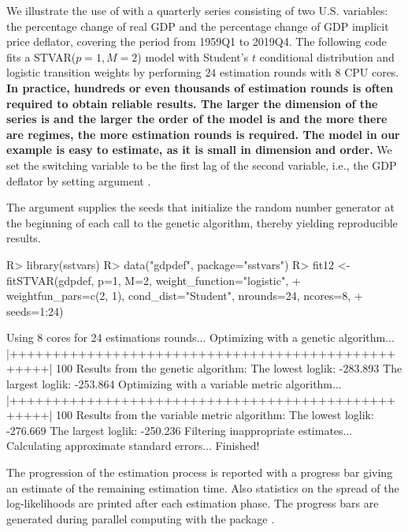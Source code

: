 \documentclass[nojss]{jss}
\begin{document}
We illustrate the use of  with a quarterly series consisting of two U.S. variables: the percentage change of real GDP and the percentage change of GDP implicit price deflator, covering the period from 1959Q1 to 2019Q4. The following code fits a STVAR($p=1,M=2$) model with Student's $t$ conditional distribution and logistic transition weights by performing $24$ estimation rounds with $8$ CPU cores. \textbf{In practice, hundreds or even thousands of estimation rounds is often required to obtain reliable results. The larger the dimension of the series is and the larger the order of the model is and the more there are regimes, the more estimation rounds is required. The model in our example is easy to estimate, as it is small in dimension and order.} We set the switching variable to be the first lag of the second variable, i.e., the GDP deflator by setting argument .

The argument  supplies the seeds that initialize the random number generator at the beginning of each call to the genetic algorithm, thereby yielding reproducible results.
%
\begin{CodeChunk}
\begin{CodeInput}
R> library(sstvars)
R> data("gdpdef", package="sstvars")
R> fit12 <- fitSTVAR(gdpdef, p=1, M=2, weight_function="logistic",
+    weightfun_pars=c(2, 1), cond_dist="Student", nrounds=24, ncores=8,
+    seeds=1:24)
\end{CodeInput}
\begin{CodeOutput}
Using 8 cores for 24 estimations rounds...
Optimizing with a genetic algorithm...
  |++++++++++++++++++++++++++++++++++++++++++++++++++| 100%
Results from the genetic algorithm:
The lowest loglik:  -283.893
The largest loglik: -253.864
Optimizing with a variable metric algorithm...
  |++++++++++++++++++++++++++++++++++++++++++++++++++| 100%
Results from the variable metric algorithm:
The lowest loglik:  -276.669
The largest loglik: -250.236
Filtering inappropriate estimates...
Calculating approximate standard errors...
Finished!
\end{CodeOutput}
\end{CodeChunk}
%
The progression of the estimation process is reported with a progress bar giving an estimate of the remaining estimation time. Also statistics on the spread of the log-likelihoods are printed after each estimation phase. The progress bars are generated during parallel computing with the package  \citep{Solymos+Zawadzki:2020}.
\end{document}

